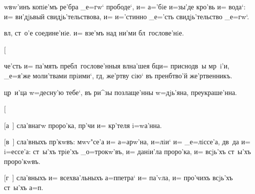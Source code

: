  w\т вw'инъ копiе'мъ ре'бра _е=гw` прободе`, 
и= а='бiе и=зы'де кро'вь и= вода`: и= ви'дjьвый 
свидjь'тельствова, и= и='стинно _е='сть свидjь'тельство 
_е=гw`.

                вл, ст~о'е соедине'нiе. и= взе'мъ над\ъ 
ни'ми бл~гослове'нiе.

[\kinovar{в~}{]} 

 че'сть и= па'мять пребл~гослове'нныя вл на'шея 
бц и= приснодв~ы мр~i'и, _е=я'же моли'твами прiими`, 
гд, же'ртву сiю` въ пренб тво'й же'ртвенникъ.


 цр~и'ца w=десну'ю тебе`, въ ри^зы позлаще'нны 
w=дjь'яна, преукраше'нна.

[\kinovar{г~}{]} 

[а~]  сла'внагw проро'ка, пр'чи и= 
кр'теля i=wа'нна.



[в~]  сла'вныхъ пр'кwвъ: мwv"се'а и= 
а=арw'на, и=лiи` и= _е=лiссе'а, дв~да и= i=ессе'а: 
ст~ы'хъ трiе'хъ _о=трокw'въ, и= данiи'ла проро'ка, и= 
всjь'хъ ст~ы'хъ проро'кwвъ.



[г~]  сла'вныхъ и= всехва'льныхъ а=п петра` 
и= па'vла, и= про'чихъ всjь'хъ ст~ы'хъ а=п.



